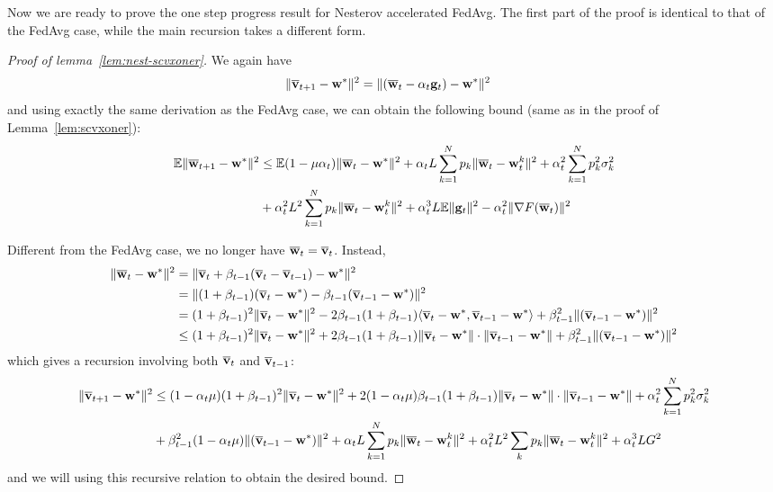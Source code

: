 Now we are ready to prove the one step progress result for Nesterov accelerated FedAvg. The first part of the proof is identical to that of the FedAvg case, while the main recursion takes a different form.
\begin{proof}[Proof of lemma~\ref{lem:nest-scvxoner}]
We again have 
\begin{align*}
\|{\overline{\mathbf{v}}}_{t+1}-{\mathbf{w}}^{\ast}\|^{2} & =\|({\overline{\mathbf{w}}}_{t}-\alpha_{t}{\mathbf{g}}_{t})-{\mathbf{w}}^{\ast}\|^{2}
\end{align*}
and using exactly the same derivation as the FedAvg case, we can obtain the following bound (same as \eq{\ref{eq:common recursion}} in the proof of Lemma~\ref{lem:scvxoner}):
\begin{align*}
	\mathbb{E}\|{\overline{\mathbf{w}}}_{t+1}-{\mathbf{w}}^{\ast}\|^{2} & \leq\mathbb{E}(1-\mu\alpha_{t})\|{\overline{\mathbf{w}}}_{t}-{\mathbf{w}}^{\ast}\|^{2}+\alpha_{t}L\sum_{k=1}^{N}p_{k}\|{\overline{\mathbf{w}}}_{t}-{\mathbf{w}}_{t}^{k}\|^{2}+\alpha_{t}^{2}\sum_{k=1}^{N}p_{k}^{2}\sigma_{k}^{2}\\
	& +\alpha_{t}^{2}L^{2}\sum_{k=1}^{N}p_{k}\|{\overline{\mathbf{w}}}_{t}-{\mathbf{w}}_{t}^{k}\|^{2}+\alpha_{t}^{3}L\mathbb{E}\|{\mathbf{g}}_{t}\|^{2}-\alpha_{t}^{2}\|\nabla F({\overline{\mathbf{w}}}_{t})\|^{2}
	\end{align*}

Different from the FedAvg case, we no longer have ${\overline{\mathbf{w}}}_{t}={\overline{\mathbf{v}}}_{t}$. Instead,
\begin{align*}
\|{\overline{\mathbf{w}}}_{t}-{\mathbf{w}}^{\ast}\|^{2} & =\|{\overline{\mathbf{v}}}_{t}+\beta_{t-1}({\overline{\mathbf{v}}}_{t}-{\overline{\mathbf{v}}}_{t-1})-{\mathbf{w}}^{\ast}\|^{2}\\
& =\|(1+\beta_{t-1})({\overline{\mathbf{v}}}_{t}-{\mathbf{w}}^{\ast})-\beta_{t-1}({\overline{\mathbf{v}}}_{t-1}-{\mathbf{w}}^{\ast})\|^{2}\\
& =(1+\beta_{t-1})^{2}\|{\overline{\mathbf{v}}}_{t}-{\mathbf{w}}^{\ast}\|^{2}-2\beta_{t-1}(1+\beta_{t-1})\langle{\overline{\mathbf{v}}}_{t}-{\mathbf{w}}^{\ast},{\overline{\mathbf{v}}}_{t-1}-{\mathbf{w}}^{\ast}\rangle+\beta_{t-1}^{2}\|({\overline{\mathbf{v}}}_{t-1}-{\mathbf{w}}^{\ast})\|^{2}\\
& \leq(1+\beta_{t-1})^{2}\|{\overline{\mathbf{v}}}_{t}-{\mathbf{w}}^{\ast}\|^{2}+2\beta_{t-1}(1+\beta_{t-1})\|{\overline{\mathbf{v}}}_{t}-{\mathbf{w}}^{\ast}\|\cdot\|{\overline{\mathbf{v}}}_{t-1}-{\mathbf{w}}^{\ast}\|+\beta_{t-1}^{2}\|({\overline{\mathbf{v}}}_{t-1}-{\mathbf{w}}^{\ast})\|^{2}
\end{align*}
which gives a recursion involving both ${\overline{\mathbf{v}}}_{t}$ and ${\overline{\mathbf{v}}}_{t-1}$:
\begin{align*}
\|{\overline{\mathbf{v}}}_{t+1}-{\mathbf{w}}^{\ast}\|^{2} & \leq(1-\alpha_{t}\mu)(1+\beta_{t-1})^{2}\|{\overline{\mathbf{v}}}_{t}-{\mathbf{w}}^{\ast}\|^{2}+2(1-\alpha_{t}\mu)\beta_{t-1}(1+\beta_{t-1})\|{\overline{\mathbf{v}}}_{t}-{\mathbf{w}}^{\ast}\|\cdot\|{\overline{\mathbf{v}}}_{t-1}-{\mathbf{w}}^{\ast}\|+\alpha_{t}^{2}\sum_{k=1}^{N}p_{k}^{2}\sigma_{k}^{2}\\
& +\beta_{t-1}^{2}(1-\alpha_{t}\mu)\|({\overline{\mathbf{v}}}_{t-1}-{\mathbf{w}}^{\ast})\|^{2}+\alpha_{t}L\sum_{k=1}^{N}p_{k}\|{\overline{\mathbf{w}}}_{t}-{\mathbf{w}}_{t}^{k}\|^{2}+\alpha_{t}^{2}L^{2}\sum_{k}p_{k}\|{\overline{\mathbf{w}}}_{t}-{\mathbf{w}}_{t}^{k}\|^{2}+\alpha_{t}^{3}LG^{2}
\end{align*}
and we will using this recursive relation to obtain the desired bound. 


\end{proof}
